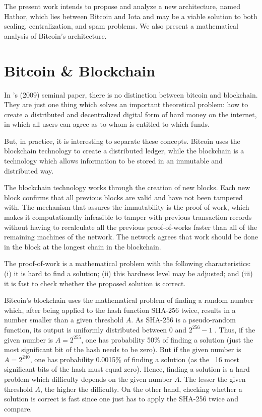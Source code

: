 The present work intends to propose and analyze a new architecture, named Hathor, which lies between Bitcoin and Iota and may be a viable solution to both scaling, centralization, and spam problems. We also present a mathematical analysis of Bitcoin's architecture.


\chapter{Bitcoin \& Blockchain}

In \citeauthor{nakamoto2008bitcoin}'s (2009) seminal paper, there is no distinction between bitcoin and blockchain. They are just one thing which solves an important theoretical problem: how to create a distributed and decentralized digital form of hard money on the internet, in which all users can agree as to whom is entitled to which funds.

But, in practice, it is interesting to separate these concepts. Bitcoin uses the blockchain technology to create a distributed ledger, while the blockchain is a technology which allows information to be stored in an immutable and distributed way.

The blockchain technology works through the creation of new blocks. Each new block confirms that all previous blocks are valid and have not been tampered with. The mechanism that assures the immutability is the proof-of-work, which makes it computationally infeasible to tamper with previous transaction records without having to recalculate all the previous proof-of-works faster than all of the remaining machines of the network. The network agrees that work should be done in the block at the longest chain in the blockchain.

The proof-of-work is a mathematical problem with the following characteristics: (i) it is hard to find a solution; (ii) this hardness level may be adjusted; and (iii) it is fast to check whether the proposed solution is correct.

Bitcoin's blockchain uses the mathematical problem of finding a random number which, after being applied to the hash function SHA-256 twice, results in a number smaller than a given threshold $A$. As SHA-256 is a pseudo-random function, its output is uniformly distributed between 0 and $2^{256}-1$ \citep{gilbert2003security}. Thus, if the given number is $A = 2^{255}$, one has probability 50\% of finding a solution (just the most significant bit of the hash needs to be zero). But if the given number is $A = 2^{240}$, one has probability 0.0015\% of finding a solution (as the ~16 most significant bits of the hash must equal zero). Hence, finding a solution is a hard problem which difficulty depends on the given number $A$. The lesser the given threshold $A$, the higher the difficulty. On the other hand, checking whether a solution is correct is fast since one just has to apply the SHA-256 twice and compare.

